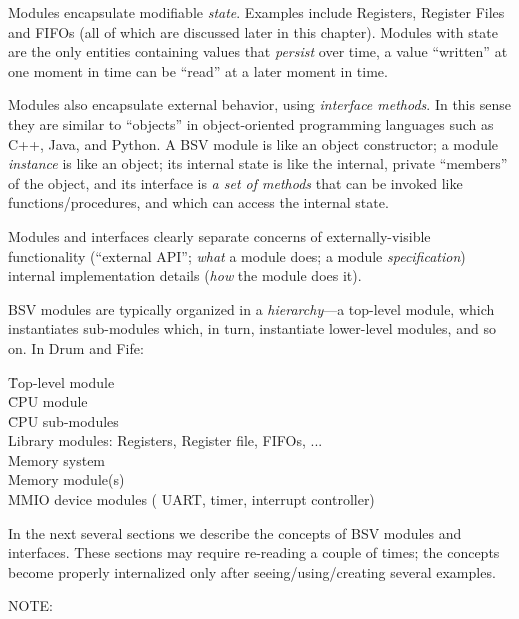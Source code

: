 Modules encapsulate modifiable \emph{state}.  Examples include
Registers, Register Files and FIFOs (all of which are discussed later
in this chapter).  Modules with state are the only entities containing
values that \emph{persist} over time, {\ie} a value ``written'' at one
moment in time can be ``read'' at a later moment in time.


Modules also encapsulate external behavior, using \emph{interface
methods}.  In this sense they are similar to ``objects'' in
object-oriented programming languages such as C++, Java, and Python.
A BSV module is like an object constructor; a module \emph{instance}
is like an object; its internal state is like the internal, private
``members'' of the object, and its interface is \emph{a set of
methods} that can be invoked like functions/procedures, and which can
access the internal state.

Modules and interfaces clearly separate concerns of externally-visible
functionality (``external API''; \emph{what} a module does; a module
\emph{specification}) {\vs} internal implementation details
(\emph{how} the module does it).

BSV modules are typically organized in a \emph{hierarchy}---a
top-level module, which instantiates sub-modules which, in turn,
instantiate lower-level modules, and so on. In Drum and Fife:
\begin{tabbing}
\hmm \= Top-level module \\
     \> \hmm \= CPU module \\
     \>      \> \hmm \= CPU sub-modules \\
     \>      \>      \> \hmm Library modules: Registers, Register file, FIFOs, ... \\
     \>      \> Memory system \\
     \>      \>      \> Memory module(s) \\
     \>      \>      \> MMIO device modules ({\eg} UART, timer, interrupt controller)
\end{tabbing}

In the next several sections we describe the concepts of BSV modules
and interfaces.  These sections may require re-reading a couple of
times; the concepts become properly internalized only after
seeing/using/creating several examples.

\vspace{2ex}

NOTE:

